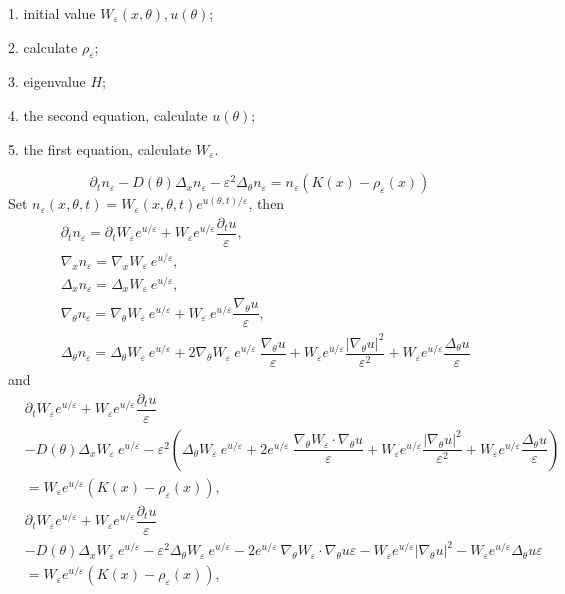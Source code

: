 \documentclass{article}
\begin{document}
1. initial value $W_\varepsilon(x,\theta), u(\theta)$;

2. calculate $\rho_\varepsilon$;

3. eigenvalue $H$;

4. the second equation, calculate $u(\theta)$;

5. the first equation, calculate $W_\varepsilon$.

\newpage

$$
    \partial_t n_\varepsilon -D(\theta)\Delta_x n_\varepsilon -\varepsilon^2\Delta_\theta n_\varepsilon = n_\varepsilon(K(x)-\rho_\varepsilon(x))
$$
Set $n_\varepsilon(x,\theta, t) = W_\varepsilon(x,\theta, t) e^{u(\theta, t)/\varepsilon}$, then
\begin{equation}
\begin{aligned}
&\partial_t n_\varepsilon = \partial_t W_\varepsilon e^{u/\varepsilon} + W_\varepsilon e^{u/\varepsilon}\dfrac{\partial_t u}{\varepsilon},\\
&\nabla_x n_\varepsilon = \nabla_x W_\varepsilon ~e^{u/\varepsilon},\\
&\Delta_x n_\varepsilon = \Delta_x W_\varepsilon ~e^{u/\varepsilon},\\
&\nabla_\theta n_\varepsilon = \nabla_\theta W_\varepsilon ~e^{u/\varepsilon} + W_\varepsilon ~e^{u/\varepsilon} \dfrac{\nabla_\theta u}{\varepsilon},\\
&\Delta_\theta n_\varepsilon = \Delta_\theta W_\varepsilon ~e^{u/\varepsilon} + 2\nabla_\theta W_\varepsilon~e^{u/\varepsilon}~\dfrac{\nabla_\theta u}{\varepsilon} + W_\varepsilon e^{u/\varepsilon}\dfrac{|\nabla_\theta u|^2}{\varepsilon^2} + W_\varepsilon e^{u/\varepsilon}\dfrac{\Delta_\theta u}{\varepsilon}
\end{aligned}
\end{equation}
and
\begin{equation}
\begin{aligned}
&\partial_t W_\varepsilon e^{u/\varepsilon} + W_\varepsilon e^{u/\varepsilon}\dfrac{\partial_t u}{\varepsilon}\\
&-D(\theta)\Delta_x W_\varepsilon ~e^{u/\varepsilon} -\varepsilon^2\left(\Delta_\theta W_\varepsilon ~e^{u/\varepsilon} + 2e^{u/\varepsilon}~\dfrac{\nabla_\theta W_\varepsilon\cdot \nabla_\theta u}{\varepsilon} + W_\varepsilon e^{u/\varepsilon}\dfrac{|\nabla_\theta u|^2}{\varepsilon^2} + W_\varepsilon e^{u/\varepsilon}\dfrac{\Delta_\theta u}{\varepsilon}\right)\\
&= W_\varepsilon e^{u/\varepsilon}(K(x)-\rho_\varepsilon(x)),\\
&\partial_t W_\varepsilon e^{u/\varepsilon} + W_\varepsilon e^{u/\varepsilon}\dfrac{\partial_t u}{\varepsilon}\\
&-D(\theta)\Delta_x W_\varepsilon ~e^{u/\varepsilon} -\varepsilon^2\Delta_\theta W_\varepsilon ~e^{u/\varepsilon} - 2e^{u/\varepsilon}~\nabla_\theta W_\varepsilon\cdot \nabla_\theta u\varepsilon - W_\varepsilon e^{u/\varepsilon}|\nabla_\theta u|^2 - W_\varepsilon e^{u/\varepsilon}\Delta_\theta u\varepsilon\\
&= W_\varepsilon e^{u/\varepsilon}(K(x)-\rho_\varepsilon(x)),\\
\end{aligned}
\end{equation}
\end{document}
